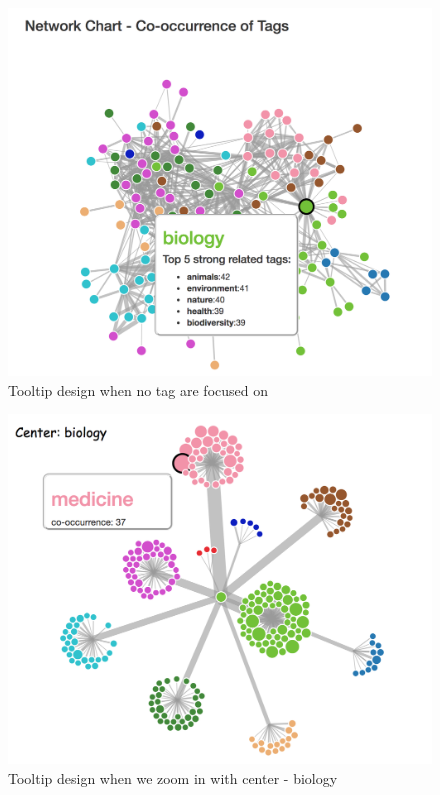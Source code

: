 \documentclass{report}
\numberwithin{figure}{section}
\begin{document}
\begin{figure}
\begin{center}
\includegraphics[scale=0.5]{top5tooltip}
\caption{Tooltip design when no tag are focused on}
\label{fig:tt1}
\end{center}
\end{figure}

\begin{figure}
\begin{center}
\includegraphics[scale=0.5]{zoomintooltip}
\caption{Tooltip design when we zoom in with center - biology}
\label{fig:tt2}
\end{center}
\end{figure}
\end{document}
